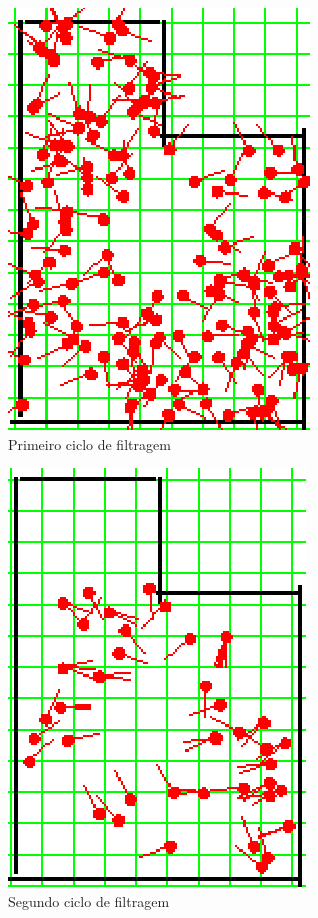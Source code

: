 \begin{figure}[H]
  \centering
  \includegraphics[scale=0.6]{figuras/cen1_ex2/2.eps}
  \caption[Primeiro Ciclo de Filtragem]{Primeiro ciclo de filtragem}
  \label{img:cen1_ex2_2}
\end{figure}

\begin{figure}[H]
  \centering
  \includegraphics[scale=0.6]{figuras/cen1_ex2/3.eps}
  \caption[Segundo Ciclo de Filtragem]{Segundo ciclo de filtragem}
  \label{img:cen1_ex2_3}
\end{figure}

